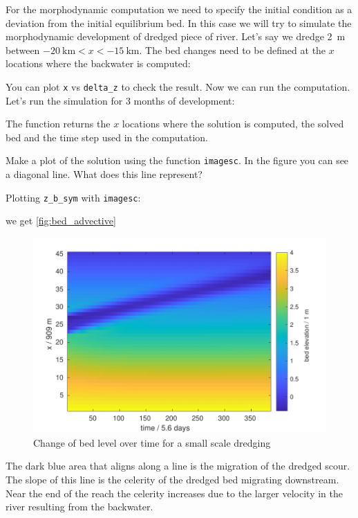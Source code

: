 \documentclass[a4paper]{article}
\begin{document}
For the morphodynamic computation we need to specify the initial condition as a deviation from the initial equilibrium bed. In this case we will try to simulate the morphodynamic development of dredged piece of river.
Let's say we dredge \SI{2}{\m} between $-\SI{20}{\kilo\m}<x<-\SI{15}{\kilo\m}$.
The bed changes need to be defined at the $x$ locations where the backwater is computed:

You can plot \lstinline{x} vs \lstinline{delta_z} to check the result.
Now we can run the computation. Let's run the simulation for 3 months of development:

The function returns the $x$ locations where the solution is computed, the solved bed and the time step used in the computation.
\begin{exercise}
  Make a plot of the solution using the function \lstinline{imagesc}. In the figure you can see a diagonal line. What does this line represent?
\end{exercise}
\begin{solution}
  Plotting \lstinline|z_b_sym| with \lstinline|imagesc|:
  
  we get \autoref{fig:bed_advective}
  \begin{figure}
      \centering
      \includegraphics[width=\linewidth]{matlab/bed_advective.pdf}
      \caption{Change of bed level over time for a small scale dredging}
      \label{fig:bed_advective}
  \end{figure}
  The dark blue area that aligns along a line is the migration of the dredged scour. The slope of this line is the celerity of the dredged bed migrating downstream. Near the end of the reach the celerity increases due to the larger velocity in the river resulting from the backwater.
\end{solution}
\end{document}

